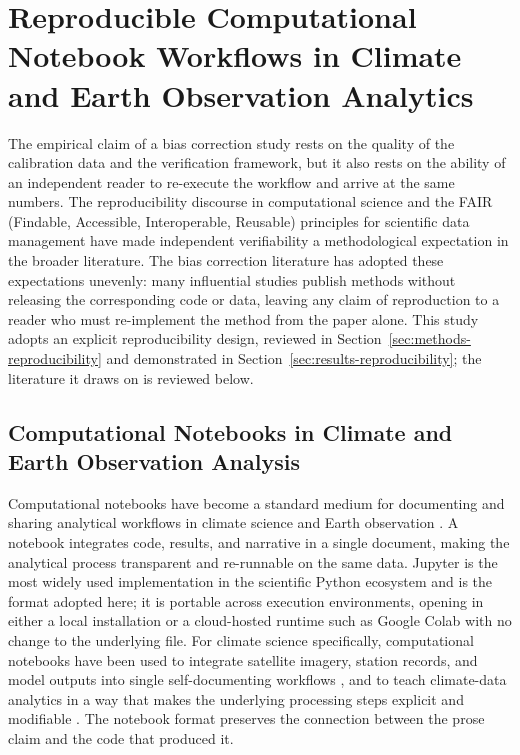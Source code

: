 \section{Reproducible Computational Notebook Workflows in Climate and Earth Observation Analytics}\label{sec:lit-reproducibility}

The empirical claim of a bias correction study rests on the
quality of the calibration data and the verification framework,
but it also rests on the ability of an independent reader to
re-execute the workflow and arrive at the same numbers. The
reproducibility discourse in computational science
\citep{ref:peng2011, ref:stodden2014} and the FAIR (Findable,
Accessible, Interoperable, Reusable) principles for scientific
data management \citep{ref:wilkinson2016} have
made independent verifiability a methodological expectation in
the broader literature. The bias correction literature has
adopted these expectations unevenly: many influential studies
publish methods without releasing the corresponding code or
data, leaving any claim of reproduction to a reader who must
re-implement the method from the paper alone. This study adopts an
explicit reproducibility design, reviewed in
Section~\ref{sec:methods-reproducibility} and demonstrated in
Section~\ref{sec:results-reproducibility}; the literature it draws
on is reviewed below.

\subsection{Computational Notebooks in Climate and Earth Observation Analysis}

Computational notebooks have become a standard medium for
documenting and sharing analytical workflows in climate science
and Earth observation \cite{ref:perkel2018, ref:wagemann2022}. 
A notebook integrates code, results, and
narrative in a single document, making the analytical process
transparent and re-runnable on the same data. Jupyter is the
most widely used implementation in the scientific Python
ecosystem and is the format adopted here; it is portable across
execution environments, opening in either a local installation or a
cloud-hosted runtime such as Google Colab with no change to
the underlying file. For climate science specifically,
computational notebooks have been used to integrate satellite
imagery, station records, and model outputs into single
self-documenting workflows \citep{ref:kluyver2016, ref:gentemann2021},
and to teach climate-data analytics in a way that makes the
underlying processing steps explicit and modifiable
\citep{ref:wagemann2022}. The notebook format
preserves the connection between the prose claim and the code
that produced it.

